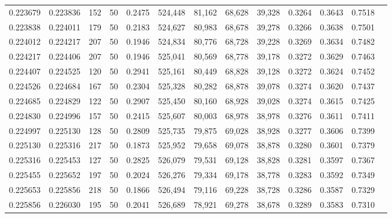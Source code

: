 \begin{tabular}{rrrrrrrrrrrrr}
0.223679 & 0.223836 &   152 &  50 &                                     0.2475 & 524,448 &  81,162 &  68,628 &  39,328 & 0.3264 & 0.3643 & 0.7518 \\
0.223838 & 0.224011 &   179 &  50 &                                     0.2183 & 524,627 &  80,983 &  68,678 &  39,278 & 0.3266 & 0.3638 & 0.7501 \\
0.224012 & 0.224217 &   207 &  50 &                                     0.1946 & 524,834 &  80,776 &  68,728 &  39,228 & 0.3269 & 0.3634 & 0.7482 \\
0.224217 & 0.224406 &   207 &  50 &                                     0.1946 & 525,041 &  80,569 &  68,778 &  39,178 & 0.3272 & 0.3629 & 0.7463 \\
0.224407 & 0.224525 &   120 &  50 &                                     0.2941 & 525,161 &  80,449 &  68,828 &  39,128 & 0.3272 & 0.3624 & 0.7452 \\
0.224526 & 0.224684 &   167 &  50 &                                     0.2304 & 525,328 &  80,282 &  68,878 &  39,078 & 0.3274 & 0.3620 & 0.7437 \\
0.224685 & 0.224829 &   122 &  50 &                                     0.2907 & 525,450 &  80,160 &  68,928 &  39,028 & 0.3274 & 0.3615 & 0.7425 \\
0.224830 & 0.224996 &   157 &  50 &                                     0.2415 & 525,607 &  80,003 &  68,978 &  38,978 & 0.3276 & 0.3611 & 0.7411 \\
0.224997 & 0.225130 &   128 &  50 &                                     0.2809 & 525,735 &  79,875 &  69,028 &  38,928 & 0.3277 & 0.3606 & 0.7399 \\
0.225130 & 0.225316 &   217 &  50 &                                     0.1873 & 525,952 &  79,658 &  69,078 &  38,878 & 0.3280 & 0.3601 & 0.7379 \\
0.225316 & 0.225453 &   127 &  50 &                                     0.2825 & 526,079 &  79,531 &  69,128 &  38,828 & 0.3281 & 0.3597 & 0.7367 \\
0.225455 & 0.225652 &   197 &  50 &                                     0.2024 & 526,276 &  79,334 &  69,178 &  38,778 & 0.3283 & 0.3592 & 0.7349 \\
0.225653 & 0.225856 &   218 &  50 &                                     0.1866 & 526,494 &  79,116 &  69,228 &  38,728 & 0.3286 & 0.3587 & 0.7329 \\
0.225856 & 0.226030 &   195 &  50 &                                     0.2041 & 526,689 &  78,921 &  69,278 &  38,678 & 0.3289 & 0.3583 & 0.7310 \\

\end{tabular}
